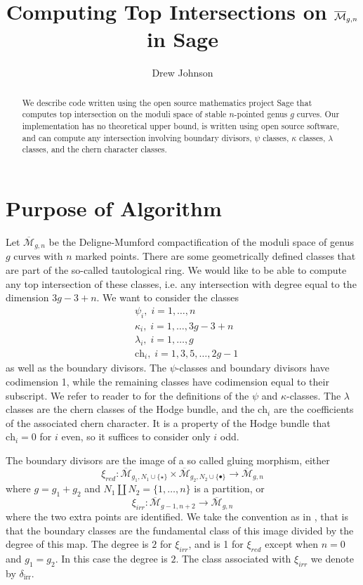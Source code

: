 \documentclass{amsart}
\author{Drew Johnson}
\title{Computing Top Intersections on $\Mgn$ in Sage}
\newcommand{\M}[2]{\overline{\mathcal M}_{{#1},{#2}}}
\newcommand{\Mgn}{\M gn}
\newcommand{\ch}{\text{ch}}
\newcommand{\di}{\delta_{\text{irr}}}
\begin{document}
\begin{abstract}
We describe code written using the open source mathematics project Sage that computes top intersection on the moduli space of stable $n$-pointed genus $g$ curves.  Our implementation has no theoretical upper bound, is written using open source software, and can compute any intersection involving boundary divisors, $\psi$ classes, $\kappa$ classes, $\lambda$ classes, and the chern character classes.  
\end{abstract}

\maketitle
\section{Purpose of Algorithm}
Let $\Mgn$ be the Deligne-Mumford compactification of the moduli space of genus $g$ curves with $n$ marked points.  There are some geometrically defined classes that are part of the so-called tautological ring.  We would like to be able to compute any top intersection of these classes, i.e. any intersection with degree equal to the dimension $3g-3+n$.  We want to consider the classes
\begin{align*}
&\psi_i,\; i = 1, \dots, n \\
&\kappa_i,\; i = 1, \dots, 3g-3+n\\
&\lambda_i,\; i = 1, \dots, g \\
&\ch_i,\; i = 1, 3, 5, \dots, 2g-1
\end{align*}  
as well as the boundary divisors.  The $\psi$-classes and boundary divisors have codimension 1, while the remaining classes have codimension equal to their subscript.  We refer to reader to \cite{AC} for the definitions of the $\psi$ and $\kappa$-classes.  The $\lambda$ classes are the chern classes of the Hodge bundle, and the $\ch_i$ are the coefficients of the associated chern character.  It is a property of the Hodge bundle that $\ch_i=0$ for $i$ even, so it suffices to consider only $i$ odd.

The boundary divisors are the image of a so called gluing morphism, either 
\[
 \xi_{red}: \M{g_1}{N_1 \cup \{\star\}} \times \M{g_2}{N_2 \cup \{\bullet\}} \rightarrow \M{g}{n}
\]
where $g = g_1 + g_2$ and $N_1 \coprod N_2 = \{1, \dots, n\}$ is a partition, or
\[
	\xi_{irr}: \M{g-1}{n + 2}  \rightarrow \M gn
\]
where the two extra points are identified.  We take the convention as in \cite{faber}, that is that the boundary classes are the fundamental class of this image divided by the degree of this map.  The degree is $2$ for $\xi_{irr}$, and is 1 for $\xi_{red}$ except when $n=0$ and $g_1=g_2$. In this case the degree is $2$.  The class associated with $\xi_{irr}$ we denote by $\di$.
\end{document}
